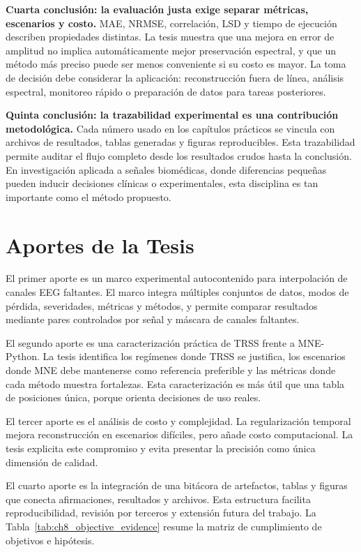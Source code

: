 \textbf{Cuarta conclusión: la evaluación justa exige separar métricas, escenarios y costo.} MAE, NRMSE, correlación, LSD y tiempo de ejecución describen propiedades distintas. La tesis muestra que una mejora en error de amplitud no implica automáticamente mejor preservación espectral, y que un método más preciso puede ser menos conveniente si su costo es mayor. La toma de decisión debe considerar la aplicación: reconstrucción fuera de línea, análisis espectral, monitoreo rápido o preparación de datos para tareas posteriores.

\textbf{Quinta conclusión: la trazabilidad experimental es una contribución metodológica.} Cada número usado en los capítulos prácticos se vincula con archivos de resultados, tablas generadas y figuras reproducibles. Esta trazabilidad permite auditar el flujo completo desde los resultados crudos hasta la conclusión. En investigación aplicada a señales biomédicas, donde diferencias pequeñas pueden inducir decisiones clínicas o experimentales, esta disciplina es tan importante como el método propuesto.

\section{Aportes de la Tesis}

El primer aporte es un marco experimental autocontenido para interpolación de canales EEG faltantes. El marco integra múltiples conjuntos de datos, modos de pérdida, severidades, métricas y métodos, y permite comparar resultados mediante pares controlados por señal y máscara de canales faltantes.

El segundo aporte es una caracterización práctica de TRSS frente a MNE-Python. La tesis identifica los regímenes donde TRSS se justifica, los escenarios donde MNE debe mantenerse como referencia preferible y las métricas donde cada método muestra fortalezas. Esta caracterización es más útil que una tabla de posiciones única, porque orienta decisiones de uso reales.

El tercer aporte es el análisis de costo y complejidad. La regularización temporal mejora reconstrucción en escenarios difíciles, pero añade costo computacional. La tesis explicita este compromiso y evita presentar la precisión como única dimensión de calidad.

El cuarto aporte es la integración de una bitácora de artefactos, tablas y figuras que conecta afirmaciones, resultados y archivos. Esta estructura facilita reproducibilidad, revisión por terceros y extensión futura del trabajo. La Tabla~\ref{tab:ch8_objective_evidence} resume la matriz de cumplimiento de objetivos e hipótesis.

